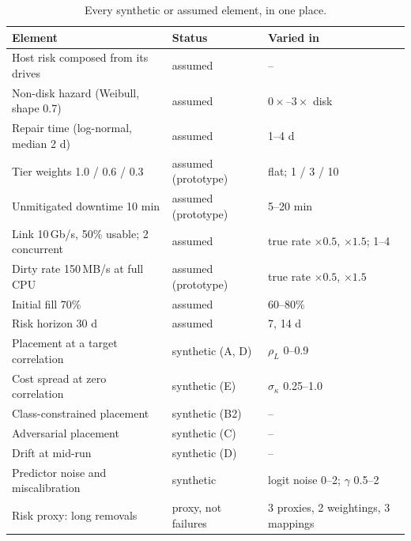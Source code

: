 \begin{table}[t]
  \centering
  \small
  \begin{tabular}{@{}p{}p{}p{}@{}}
    \toprule
    Element & Status & Varied in \\
    \midrule
    Host risk composed from its drives & assumed & -- \\
    Non-disk hazard (Weibull, shape 0.7) & assumed & $0\times$--$3\times$ disk \\
    Repair time (log-normal, median 2 d) & assumed & 1--4 d \\
    Tier weights 1.0 / 0.6 / 0.3 & assumed (prototype) & flat; 1 / 3 / 10 \\
    Unmitigated downtime 10 min & assumed (prototype) & 5--20 min \\
    Link 10\,Gb/s, 50\% usable; 2 concurrent & assumed & true rate $\times0.5$, $\times1.5$; 1--4 \\
    Dirty rate 150\,MB/s at full CPU & assumed (prototype) & true rate $\times0.5$, $\times1.5$ \\
    Initial fill 70\% & assumed & 60--80\% \\
    Risk horizon 30 d & assumed & 7, 14 d \\
    Placement at a target correlation & synthetic (A, D) & $\rho_L$ 0--0.9 \\
    Cost spread at zero correlation & synthetic (E) & $\sigma_\kappa$ 0.25--1.0 \\
    Class-constrained placement & synthetic (B2) & -- \\
    Adversarial placement & synthetic (C) & -- \\
    Drift at mid-run & synthetic (D) & -- \\
    Predictor noise and miscalibration & synthetic & logit noise 0--2; $\gamma$ 0.5--2 \\
    Risk proxy: long removals & proxy, not failures & 3 proxies, 2 weightings, 3 mappings \\
    \bottomrule
  \end{tabular}
  \caption{Every synthetic or assumed element, in one place.}
  \label{tab:assumed}
\end{table}

